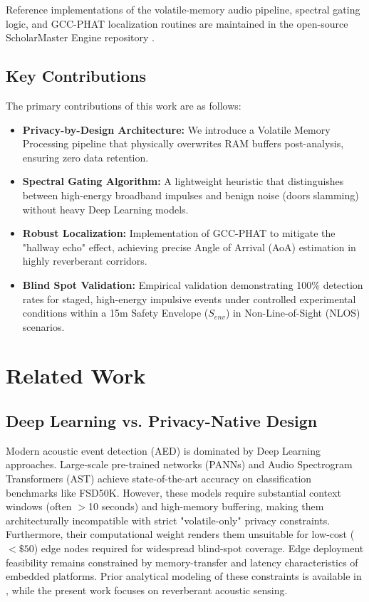 \documentclass[conference]{IEEEtran}
\begin{document}
Reference implementations of the volatile-memory audio pipeline, spectral gating logic, and GCC-PHAT localization routines are maintained in the open-source ScholarMaster Engine repository \cite{scholarmaster_repo}.

\subsection{Key Contributions}
The primary contributions of this work are as follows:
\begin{itemize}
    \item \textbf{Privacy-by-Design Architecture:} We introduce a Volatile Memory Processing pipeline that physically overwrites RAM buffers post-analysis, ensuring zero data retention.
    \item \textbf{Spectral Gating Algorithm:} A lightweight heuristic that distinguishes between high-energy broadband impulses and benign noise (doors slamming) without heavy Deep Learning models.
    \item \textbf{Robust Localization:} Implementation of GCC-PHAT to mitigate the "hallway echo" effect, achieving precise Angle of Arrival (AoA) estimation in highly reverberant corridors.
    \item \textbf{Blind Spot Validation:} Empirical validation demonstrating 100\% detection rates for staged, high-energy impulsive events under controlled experimental conditions within a 15m Safety Envelope ($S_{env}$) in Non-Line-of-Sight (NLOS) scenarios.
\end{itemize}

\section{Related Work}

\subsection{Deep Learning vs. Privacy-Native Design}
Modern acoustic event detection (AED) is dominated by Deep Learning approaches. Large-scale pre-trained networks (PANNs) \cite{b22} and Audio Spectrogram Transformers (AST) \cite{b23} achieve state-of-the-art accuracy on classification benchmarks like FSD50K. However, these models require substantial context windows (often $>$10 seconds) and high-memory buffering, making them architecturally incompatible with strict "volatile-only" privacy constraints. Furthermore, their computational weight renders them unsuitable for low-cost ($<\$50$) edge nodes required for widespread blind-spot coverage. Edge deployment feasibility remains constrained by memory-transfer and latency characteristics of embedded platforms. Prior analytical modeling of these constraints is available in \cite{b27}, while the present work focuses on reverberant acoustic sensing.
\end{document}
